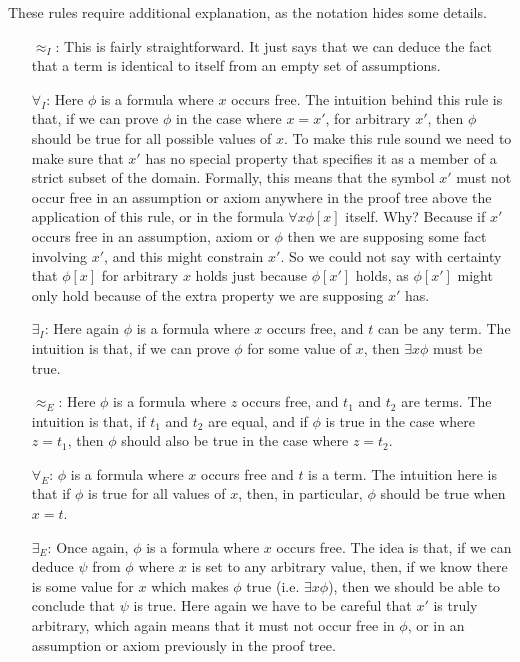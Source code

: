 \documentclass{article}
\theoremstyle{plain}
\begin{document}
These rules require additional explanation, as the notation hides some details.

\begin{itemize}
\item[$\approx_I$:] This is fairly straightforward. It just says that we can deduce the fact that a term is identical to itself from an empty set of assumptions.
\item[$\forall_I$:] Here $\phi$ is a formula where $x$ occurs free. The intuition behind this rule is that, if we can prove $\phi$ in the case where $x=x'$, for arbitrary $x'$, then $\phi$ should be true for all possible values of $x$. To make this rule sound we need to make sure that $x'$ has no special property that specifies it as a member of a strict subset of the domain. Formally, this means that the symbol $x'$ must not occur free in an assumption or axiom anywhere in the proof tree above the application of this rule, or in the formula $\forall x \phi[x]$ itself. Why? Because if $x'$ occurs free in an assumption, axiom or $\phi$ then we are supposing some fact involving $x'$, and this might constrain $x'$. So we could not say with certainty that $\phi[x]$ for arbitrary $x$ holds just because $\phi[x']$ holds, as $\phi[x']$ might only hold because of the extra property we are supposing $x'$ has.  
\item[$\exists_I$:] Here again $\phi$ is a formula where $x$ occurs free, and $t$ can be any term. The intuition is that, if we can prove $\phi$ for some value of $x$, then $\exists x\phi$ must be true.
\item[$\approx_E$:] Here $\phi$ is a formula where $z$ occurs free, and $t_1$ and $t_2$ are terms. The intuition is that, if $t_1$ and $t_2$ are equal, and if $\phi$ is true in the case where $z= t_1$, then $\phi$ should also be true in the case where $z= t_2$.  
\item[$\forall_E$:] $\phi$ is a formula where $x$ occurs free and $t$ is a term. The intuition here is that if $\phi$ is true for all values of $x$, then, in particular, $\phi$ should be true when $x = t$.
\item[$\exists_E$:] Once again, $\phi$ is a formula where $x$ occurs free. The idea is that, if we can deduce $\psi$ from $\phi$ where $x$ is set to any arbitrary value, then, if we know there is some value for $x$ which makes $\phi$ true (i.e. $\exists x\phi$), then we should be able to conclude that $\psi$ is true. Here again we have to be careful that $x'$ is truly arbitrary, which again means that it must not occur free in $\phi$, or in an assumption or axiom previously in the proof tree.  
\end{itemize}
\end{document}
